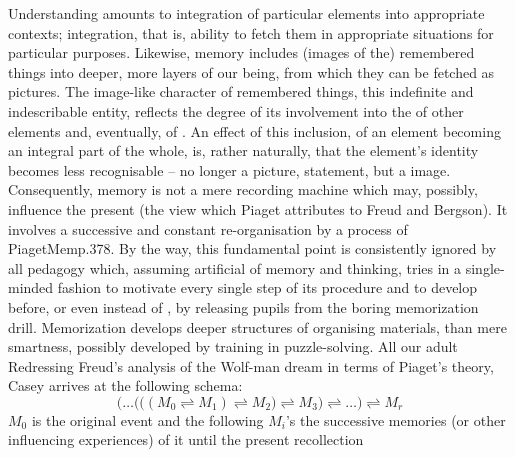 \pa Understanding amounts to integration of particular elements into appropriate
contexts; integration, that is, ability to fetch them in appropriate situations
for particular purposes. Likewise, memory includes (images of the) remembered
things into deeper, more  layers of our being, from which they can
be fetched as  pictures. The image-like character of remembered
things, this indefinite and indescribable entity, reflects the degree of its
involvement into the  of other elements and, eventually, 
of . An effect of this inclusion, of an element becoming an
integral part of the whole, is, rather naturally, that the element's identity
becomes less recognisable -- no longer a  picture, 
statement, but a  image.
%
Consequently, memory is not a mere recording machine which may, possibly,
influence the present (the view which Piaget attributes to Freud and Bergson).
It involves a successive and constant re-organisation by a process of
\citet{active and selective structuring.}{PiagetMem}{p.378. By the way, this fundamental point is
  consistently ignored by all pedagogy which, assuming artificial
   of memory and thinking, tries in a single-minded fashion to
  motivate every single step of its procedure and to develop 
  before, or even instead of , by releasing pupils from the boring
  memorization drill. Memorization develops deeper structures of organising
  materials, than mere smartness, possibly developed by training in
  puzzle-solving.}  All our adult  Redressing
Freud's analysis of the Wolf-man dream in terms of Piaget's theory, Casey
arrives at the following schema:
\[
  \bigg(\ldots\Big(\big( (M_{0} \rightleftharpoons M_{1}) 
     \rightleftharpoons M_{2}\big)
     \rightleftharpoons M_{3}\Big) \rightleftharpoons \ldots \bigg)
     \rightleftharpoons M_{r}
\]
$M_{0}$ is the original event and the following $M_{i}$'s the successive
memories (or other influencing experiences) of it until the present recollection
